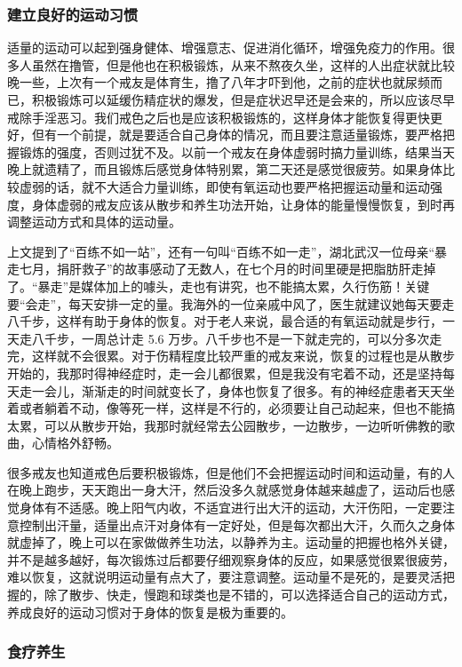 \subsubsection{建立良好的运动习惯}

适量的运动可以起到强身健体、增强意志、促进消化循环，增强免疫力的作用。很多人虽然在撸管，但是他也在积极锻炼，从来不熬夜久坐，这样的人出症状就比较晚一些，上次有一个戒友是体育生，撸了八年才吓到他，之前的症状也就尿频而已，积极锻炼可以延缓伤精症状的爆发，但是症状迟早还是会来的，所以应该尽早戒除手淫恶习。我们戒色之后也是应该积极锻炼的，这样身体才能恢复得更快更好，但有一个前提，就是要适合自己身体的情况，而且要注意适量锻炼，要严格把握锻炼的强度，否则过犹不及。以前一个戒友在身体虚弱时搞力量训练，结果当天晚上就遗精了，而且锻炼后感觉身体特别累，第二天还是感觉很疲劳。如果身体比较虚弱的话，就不大适合力量训练，即使有氧运动也要严格把握运动量和运动强度，身体虚弱的戒友应该从散步和养生功法开始，让身体的能量慢慢恢复，到时再调整运动方式和具体的运动量。

上文提到了“百练不如一站”，还有一句叫“百练不如一走”，湖北武汉一位母亲“暴走七月，捐肝救子”的故事感动了无数人，在七个月的时间里硬是把脂肪肝走掉了。“暴走”是媒体加上的噱头，走也有讲究，也不能搞太累，久行伤筋！关键要“会走”，每天安排一定的量。我海外的一位亲戚中风了，医生就建议她每天要走八千步，这样有助于身体的恢复。对于老人来说，最合适的有氧运动就是步行，一天走八千步，一周总计走 5.6 万步。八千步也不是一下就走完的，可以分多次走完，这样就不会很累。对于伤精程度比较严重的戒友来说，恢复的过程也是从散步开始的，我那时得神经症时，走一会儿都很累，但是我没有宅着不动，还是坚持每天走一会儿，渐渐走的时间就变长了，身体也恢复了很多。有的神经症患者天天坐着或者躺着不动，像等死一样，这样是不行的，必须要让自己动起来，但也不能搞太累，可以从散步开始，我那时就经常去公园散步，一边散步，一边听听佛教的歌曲，心情格外舒畅。

很多戒友也知道戒色后要积极锻炼，但是他们不会把握运动时间和运动量，有的人在晚上跑步，天天跑出一身大汗，然后没多久就感觉身体越来越虚了，运动后也感觉身体有不适感。晚上阳气内收，不适宜进行出大汗的运动，大汗伤阳，一定要注意控制出汗量，适量出点汗对身体有一定好处，但是每次都出大汗，久而久之身体就虚掉了，晚上可以在家做做养生功法，以静养为主。运动量的把握也格外关键，并不是越多越好，每次锻炼过后都要仔细观察身体的反应，如果感觉很累很疲劳，难以恢复，这就说明运动量有点大了，要注意调整。运动量不是死的，是要灵活把握的，除了散步、快走，慢跑和球类也是不错的，可以选择适合自己的运动方式，养成良好的运动习惯对于身体的恢复是极为重要的。

\subsubsection{食疗养生}

